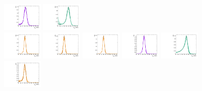 \begin{figure}[htbp]
  \includegraphics[width=0.18\textwidth]{fig/2Dfit/templateSignalVsMX_fromDC_WprToWZ_MJJ_mu_LP_bb_LDy.pdf}
  \includegraphics[width=0.18\textwidth]{fig/2Dfit/templateSignalVsMX_fromDC_WprToWH_MJJ_mu_LP_bb_LDy.pdf}\\
  \includegraphics[width=0.18\textwidth]{fig/2Dfit/templateSignalVsMX_fromDC_GbuToWW_MJJ_mu_HP_nobb_LDy.pdf}
  \includegraphics[width=0.18\textwidth]{fig/2Dfit/templateSignalVsMX_fromDC_RadToWW_MJJ_mu_HP_nobb_LDy.pdf}
  \includegraphics[width=0.18\textwidth]{fig/2Dfit/templateSignalVsMX_fromDC_ZprToWW_MJJ_mu_HP_nobb_LDy.pdf}
  \includegraphics[width=0.18\textwidth]{fig/2Dfit/templateSignalVsMX_fromDC_WprToWZ_MJJ_mu_HP_nobb_LDy.pdf}
  \includegraphics[width=0.18\textwidth]{fig/2Dfit/templateSignalVsMX_fromDC_WprToWH_MJJ_mu_HP_nobb_LDy.pdf}\\
  \includegraphics[width=0.18\textwidth]{fig/2Dfit/templateSignalVsMX_fromDC_GbuToWW_MJJ_mu_LP_nobb_LDy.pdf}

\end{figure}
